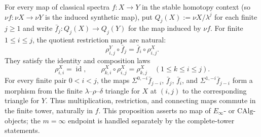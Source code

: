 \begin{proposition}
  \label{prop:lambda-quotient-restriction-coherence}
  \notready
  For every map of classical spectra $f:X\to Y$ in the stable homotopy
  context (so $\nu f:\nu X\to\nu Y$ is the induced synthetic map), put
  $Q_j(X):=\nu X/\lambda^j$ for each finite $j\ge1$ and write
  $\bar f_j:Q_j(X)\to Q_j(Y)$ for the map induced by $\nu f$.  For finite
  $1\le i\le j$, the quotient restriction maps are natural:
  \[
    \rho^Y_{i,j}\circ\bar f_j
      =\bar f_i\circ\rho^X_{i,j}.
  \]
  They satisfy the identity and composition laws
  \[
    \rho^X_{i,i}=\operatorname{id},\qquad
    \rho^X_{k,i}\circ\rho^X_{i,j}=\rho^X_{k,j}
    \quad(1\le k\le i\le j).
  \]
  For every finite pair $0<i<j$, the maps
  $\Sigma^{0,-i}\bar f_{j-i}$, $\bar f_j$, $\bar f_i$, and
  $\Sigma^{1,-i}\bar f_{j-i}$ form a morphism from the finite
  $\lambda$--$\rho$--$\delta$ triangle for $X$ at $(i,j)$ to the
  corresponding triangle for $Y$.  Thus multiplication, restriction, and
  connecting maps commute in the finite tower, naturally in $f$.  This
  proposition asserts no map of $E_\infty$- or $\mathrm{CAlg}$-objects; the
  $m=\infty$ endpoint is handled separately by the complete-tower statements.
\end{proposition}

